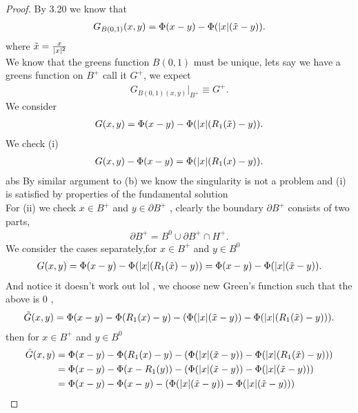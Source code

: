 \begin{proof}
 By 3.20 we know that 
 \begin{align*}
   G_{B(0,1)}(x,y) = \Phi(x-y) - \Phi(\lvert x\rvert(\tilde{x}-y ))
 .\end{align*}
 where $\tilde{x} = \frac{x}{\lvert x\rvert^2} $\\
 We know that the greens function $B(0,1)$ must be unique, lets say we have a greens function on $B^{+} $ call it $G^{+} $, we expect 
 \begin{align*}
   G_{B(0,1)(x,y)} \rvert_{B^{+} } \equiv G^{+} 
 .\end{align*}
We consider 
\begin{align*}
  G(x,y) = \Phi(x-y) - \Phi(\lvert x\rvert(R_1(\tilde{x})-y))
.\end{align*}
We check (i)
\begin{align*}
  G(x,y) - \Phi(x-y) = \Phi(\lvert x\rvert(R_1(x)-y))
.\end{align*}abs
By similar argument to (b) we know the singularity is not a problem and (i) is satisfied by properties of the fundamental solution\\
For (ii) we check $x \in  B^{+}  $ and $y \in  \partial B^{+} $ , clearly the boundary $\partial B^{+} $ consists of two parts,
\begin{align*}
  \partial B^{+}   = B^{0} \cup \partial B^{+} \cap H^{+}     
.\end{align*}
We consider the cases separately,for $x \in  B^{+} $ and $y \in  B^{0} $ \\
\begin{align*}
  G(x,y) = \Phi(x-y) - \Phi(\lvert x\rvert(R_1(\tilde{x})-y))  =  \Phi(x-y) - \Phi(\lvert x\rvert(\tilde{x} - y ))
.\end{align*}
And notice it doesn't work out lol , we choose new Green's function such that the above is 0 ,
\begin{align*}
  \tilde{G}(x,y) = \Phi(x-y) - \Phi(R_{1}(x)-y)  - (\Phi(\lvert x\rvert(\tilde{x} - y )) - \Phi(\lvert x\rvert(R_{1}(\tilde{x})-y)))
.\end{align*}
then for $x \in  B^{+} $ and $y \in  B^{0} $
\begin{align*}
 \tilde{G}(x,y) &=   \Phi(x-y) - \Phi(R_{1}(x)-y)  - (\Phi(\abs{x}(\tilde{x} - y )) - \Phi(\abs{x}(R_{1}(\tilde{x})-y)))\\
                &=\Phi(x-y) - \Phi(x-R_1(y))  - (\Phi(\abs{x}(\tilde{x} - y )) - \Phi(\abs{x}(\tilde{x}-y)))\\
                &=\Phi(x-y) - \Phi(x-y)  - (\Phi(\abs{x}(\tilde{x} - y )) - \Phi(\abs{x}(\tilde{x}-y)))\\

\end{align*}
\end{proof}
